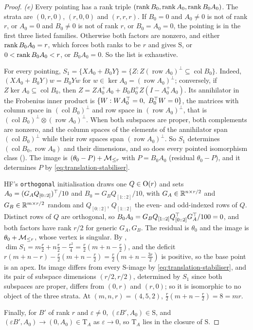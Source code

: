\begin{proof}
\emph{(e)} Every pointing has a rank triple $(\operatorname{rank} B_0,\operatorname{rank} A_0,\operatorname{rank} B_0A_0)$. The strata are $(0,r,0)$, $(r,0,0)$ and
$(r,r,r)$. If $B_0=0$ and $A_0\ne0$ is not of rank $r$, or $A_0=0$ and $B_0\ne0$ is not of rank $r$, or $B_0=A_0=0$, the
pointing is in the first three listed families. Otherwise both factors are nonzero, and either $\operatorname{rank} B_0A_0=r$, which
forces both ranks to be $r$ and gives $\mathrm S$, or $0<\operatorname{rank} B_0A_0<r$, or $B_0A_0=0$. So the list is exhaustive.

For every pointing, $S_1=\{XA_0+B_0Y\}=\{Z:Z(\operatorname{row}A_0)^\perp\subseteq\operatorname{col}B_0\}$. Indeed,
$(XA_0+B_0Y)w=B_0Yw$ for $w\in\ker A_0=(\operatorname{row}A_0)^\perp$; conversely, if
$Z\ker A_0\subseteq\operatorname{col}B_0$, then $Z=ZA_0^+A_0+B_0B_0^+Z(I-A_0^+A_0)$. Its annihilator in the Frobenius inner
product is $\{W:WA_0^{\top}=0,\ B_0^{\top} W=0\}$, the matrices with column space in $(\operatorname{col}B_0)^\perp$ and row space
in $(\operatorname{row}A_0)^\perp$, that is $(\operatorname{col}B_0)^\perp\otimes(\operatorname{row}A_0)^\perp$. When both
subspaces are proper, both complements are nonzero, and the column spaces of the elements of the annihilator span
$(\operatorname{col}B_0)^\perp$ while their row spaces span $(\operatorname{row}A_0)^\perp$. So $S_1$ determines
$(\operatorname{col}B_0,\operatorname{row}A_0)$ and their dimensions, and so does every pointed isomorphism class
(). The image is $(\theta_0-P)+\mathcal{M}_{\le r}$ with $P=B_0A_0$ (residual $\theta_0-P$), and it determines
$P$ by \eqref{eq:translation-stabiliser}.

HF's \texttt{orthogonal} initialisation draws one $Q\in\mathrm{O}(r)$ and sets $A_0=(G_AQ_{[0::2]})^{\top}/10$ and
$B_0=G_BQ_{[1::2]}/10$, with $G_A\in\mathbb{R}^{n\times r/2}$ and $G_B\in\mathbb{R}^{m\times r/2}$ random and $Q_{[0::2]}$, $Q_{[1::2]}$
the even- and odd-indexed rows of $Q$. Distinct rows of $Q$ are orthogonal, so $B_0A_0=G_BQ_{[1::2]}Q_{[0::2]}^{\top}
G_A^{\top}/100=0$, and both factors have rank $r/2$ for generic $G_A,G_B$. The residual is $\theta_0$ and the image is
$\theta_0+\mathcal{M}_{\le r}$, whose vertex is singular. By , $\dim S_1=m\tfrac r2+n\tfrac r2-\tfrac{r^2}4=
\tfrac r2(m+n-\tfrac r2)$, and the deficit $r(m+n-r)-\tfrac r2(m+n-\tfrac r2)=\tfrac r2(m+n-\tfrac{3r}2)$ is positive, so
the base point is an apex. Its image differs from every $\mathrm S$-image by \eqref{eq:translation-stabiliser}, and its
pair of subspace dimensions $(r/2,r/2)$, determined by $S_1$ since both subspaces are proper, differs from $(0,r)$ and
$(r,0)$; so it is isomorphic to no object of the three strata. At $(m,n,r)=(4,5,2)$, $\tfrac r2(m+n-\tfrac r2)=8=mr$.

Finally, for $B'$ of rank $r$ and $\varepsilon\ne0$, $(\varepsilon B',A_0)\in\mathrm S$, and $(\varepsilon B',A_0)\to
(0,A_0)\in\mathrm T_A$ as $\varepsilon\to0$, so $\mathrm T_A$ lies in the closure of $\mathrm S$.
\end{proof}

